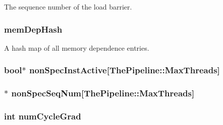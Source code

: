 \label{classMemDepUnit_adbdb10ce572ac89847d1541d471f0be6}
The sequence number of the load barrier. \hypertarget{classMemDepUnit_ac0b12f9eec0e0c6b639c7370177e5c36}{
\subsubsection[{memDepHash}]{ {\bf memDepHash}}}
\label{classMemDepUnit_ac0b12f9eec0e0c6b639c7370177e5c36}
A hash map of all memory dependence entries. \hypertarget{classMemDepUnit_aa27d1c9b589af0c77a81c490021c7dcb}{
\subsubsection[{nonSpecInstActive}]{\setlength{\rightskip}{0pt plus 5cm}bool$\ast$ {\bf nonSpecInstActive}\mbox{[}{\bf ThePipeline::MaxThreads}\mbox{]}}}
\label{classMemDepUnit_aa27d1c9b589af0c77a81c490021c7dcb}
\hypertarget{classMemDepUnit_a899b1bc10d38a0f725495bf2108479a3}{
\subsubsection[{nonSpecSeqNum}]{$\ast$ {\bf nonSpecSeqNum}\mbox{[}{\bf ThePipeline::MaxThreads}\mbox{]}}}
\label{classMemDepUnit_a899b1bc10d38a0f725495bf2108479a3}
\hypertarget{classMemDepUnit_a9bd2235f4069b61f51af0d84d5115de5}{
\subsubsection[{numCycleGrad}]{\setlength{\rightskip}{0pt plus 5cm}int {\bf numCycleGrad}}}
\label{classMemDepUnit_a9bd2235f4069b61f51af0d84d5115de5}
